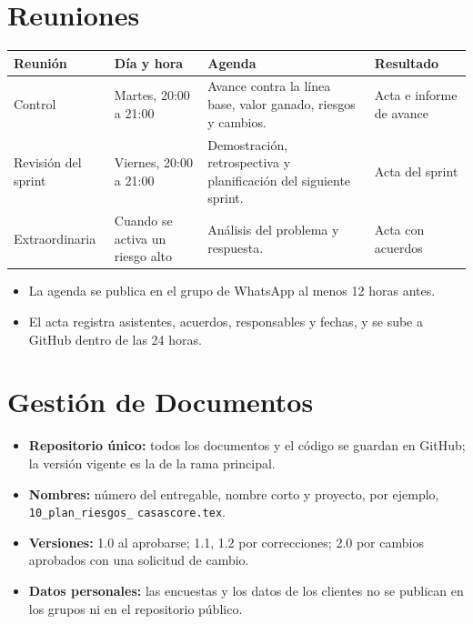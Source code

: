 \documentclass[11pt,a4paper]{article}
\begin{document}
\section{Reuniones}
{\small
{}
\noindent\begin{tabularx}{\textwidth}{@{}P{2.7cm} P{2.6cm} L P{2.6cm}@{}}
\toprule
{}
\textbf{Reunión} & \textbf{Día y hora} & \textbf{Agenda} & \textbf{Resultado} \\
\midrule
Control & Martes, 20:00 a 21:00 & Avance contra la línea base, valor ganado, riesgos y cambios. & Acta e informe de avance \\
Revisión del sprint & Viernes, 20:00 a 21:00 & Demostración, retrospectiva y planificación del siguiente sprint. & Acta del sprint \\
Extraordinaria & Cuando se activa un riesgo alto & Análisis del problema y respuesta. & Acta con acuerdos \\
\bottomrule
\end{tabularx}
}

\vspace{0.1cm}
\begin{itemize}[leftmargin=*]
    \item La agenda se publica en el grupo de WhatsApp al menos 12 horas antes.
    \item El acta registra asistentes, acuerdos, responsables y fechas, y se sube a GitHub dentro de las 24 horas.
\end{itemize}

\section{Gestión de Documentos}
\begin{itemize}[leftmargin=*]
    \item \textbf{Repositorio único:} todos los documentos y el código se guardan en GitHub; la versión vigente es la de la rama principal.
    \item \textbf{Nombres:} número del entregable, nombre corto y proyecto, por ejemplo, \texttt{10\_plan\_riesgos\_} \texttt{casascore.tex}.
    \item \textbf{Versiones:} 1.0 al aprobarse; 1.1, 1.2 por correcciones; 2.0 por cambios aprobados con una solicitud de cambio.
    \item \textbf{Datos personales:} las encuestas y los datos de los clientes no se publican en los grupos ni en el repositorio público.
\end{itemize}
\end{document}
